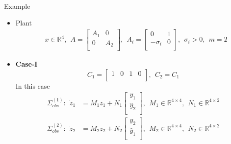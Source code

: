 \documentclass{beamer}
\newcommand{\R}{\mathbb{R}}
\begin{document}
\begin{frame}{\color{blue} }
\begin{columns}[onlytextwidth]
\begin{center}
\end{center}
\end{columns}
\end{frame}



\begin{frame}{\color{blue} Example}

\begin{itemize}
  \item Plant
\begin{align*}
& x\in\R^{4},~~ A=\begin{bmatrix} A_{1} & 0 \\ 0 & A_{2} \\ \end{bmatrix},~~ A_{i}=\begin{bmatrix} 0 & 1 \\ -\sigma_{i} & 0 \\ \end{bmatrix},~~ \sigma_{i}>0,~~ m=2
\end{align*}

  \item \textbf{Case-I}
\begin{equation*}
C_{1}=\begin{bmatrix} 1 & 0 & 1 & 0 \\ \end{bmatrix},~~ C_{2}=C_{1}
\end{equation*}
In this case
\begin{align*}
\Sigma_{obs}^{(1)}:~~ \dot{z}_{1}&=M_{1}z_{1}+ N_{1}\begin{bmatrix} y_{1} \\ \hat{y}_{2} \\ \end{bmatrix},~~ M_{1}\in\R^{4\times4},~~ N_{1}\in\R^{4\times2} \\
\Sigma_{obs}^{(2)}:~~ \dot{z}_{2}&=M_{2}z_{2}+ N_{2}\begin{bmatrix} y_{2} \\ \hat{y}_{1} \\ \end{bmatrix},~~ M_{2}\in\R^{4\times4},~~ N_{2}\in\R^{4\times2}
\end{align*}
\end{itemize}

\end{frame}
\end{document}

